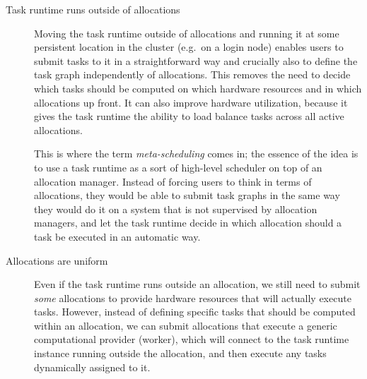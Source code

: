 \begin{description}
    \item[Task runtime runs outside of allocations] Moving the task runtime outside of allocations and running
    it at some persistent location in the cluster (e.g.\ on a login node) enables users to submit tasks to it
    in a straightforward way and crucially also to define the task graph independently of allocations.
    This removes the need to decide which
    tasks should be computed on which hardware resources and in which allocations up front. It can also
    improve hardware utilization, because it gives the task runtime the ability to load balance tasks
    across all active allocations.

    This is where the term \emph{meta-scheduling} comes in; the essence of the idea is to use
    a task runtime as a sort of high-level scheduler on top of an allocation manager. Instead of
    forcing users to think in terms of allocations, they would be able to submit task graphs in the same way
    they would do it on a system that is not supervised by allocation managers, and let the task
    runtime decide in which allocation should a task be executed in an automatic way.

    \item[Allocations are uniform] Even if the task runtime runs outside an allocation,
    we still need to submit \emph{some} allocations to provide hardware resources that will actually
    execute tasks. However, instead of defining specific tasks that should be computed within an allocation,
    we can submit allocations that execute a generic computational provider (worker), which will connect to the task runtime
    instance running outside the allocation, and then execute any tasks dynamically assigned to it.


\end{description}
